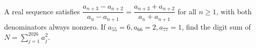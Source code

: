 A real sequence satisfies $\dfrac{a_{n+3}-a_{n+2}}{a_n-a_{n+1}}=\dfrac{a_{n+3}+a_{n+2}}{a_n+a_{n+1}}$ for all $n\ge1$, with both denominators always nonzero. If $a_{55}=6,a_{66}=2,a_{77}=1$, find the digit sum of $N=\sum_{j=1}^{2026}a_j^2$.
